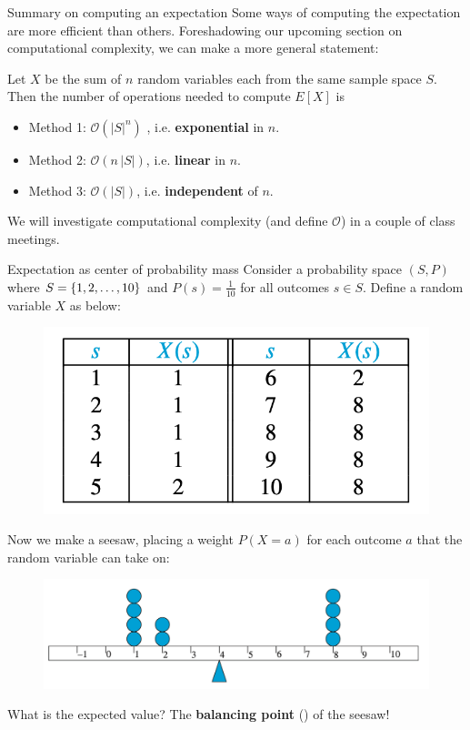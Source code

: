 \documentclass[10pt]{beamer}
\begin{document}
\begin{frame}{Summary on computing an expectation}
Some ways of computing the expectation are more efficient than others.
\vfill 
Foreshadowing our upcoming section on computational complexity, we can make a more general statement: 
\vfill 

\begin{myredbox}[title=\text{Remark: Scalability of different methods for computing an expectation}]
Let $X$ be the sum of $n$ random variables each from the same sample space $S$.  Then the number of operations needed to compute $E[X]$ is
\vfill 
\begin{itemize}
\item Method 1: $\mathcal{O}(|S|^n)$	, i.e. \textbf{exponential} in $n$.
\item Method 2: $\mathcal{O}(n \, |S|)$, i.e. \textbf{linear} in $n$.
\item Method 3: $\mathcal{O}(|S|)$,  i.e. \textbf{independent} of $n$.
\end{itemize}
\end{myredbox}

We will investigate computational complexity (and define $\mathcal{O}$) in a couple of class meetings.

\end{frame}


\begin{frame}{Expectation as center of probability mass}
\footnotesize 
Consider a probability space $(S,P)$ where $S=\{ {1,2,\hdots,10} \}$ and $P(s) =\frac{1}{10}$ for all outcomes $s \in S$.  Define a random variable $X$ as below:
\vfill 
\begin{figure}
\includegraphics[width=.5\textwidth]{images/center_of_mass__table}
\end{figure}
\vfill 
Now we make a seesaw, placing a weight $P(X=a)$ for each outcome $a$ that the random variable can take on:
\begin{figure}
\includegraphics[width=.7\textwidth]{images/center_of_mass}
\end{figure}
%
What is the expected value? \pause The \textbf{balancing point} () of the seesaw!

\end{frame}
\end{document}
